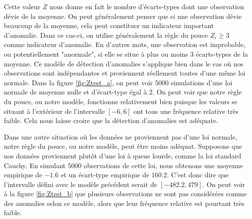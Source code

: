Cette valeur $Z$ nous donne en fait le nombre d'écarts-types dont une observation dévie de la moyenne. On peut généralement penser que si une observation dévie beaucoup de la moyenne, cela peut constituer un indicateur important d'anomalie. Dans ce cas-ci, on utilise généralement la règle du pouce $Z_i \ge 3$ comme indicateur d'anomalie. En d'autres mots, une observation est improbable, ou potentiellement "anormale", si elle se situe à plus ou moins 3 écarts-types de la moyenne. Ce modèle de détection d'anomalies s'applique bien dans le cas où nos observations sont indépendantes et proviennent réellement toutes d'une même loi normale. Dans la figure \ref{fig:Ztest_a}, on peut voir 5000 simulations d'une loi normale de moyenne nulle et d'écart-type égal à 2. On peut voir que notre règle du pouce, ou notre modèle, fonctionne relativement bien puisque les valeurs se situant à l'extérieur de l'intervalle $[-6, 6]$ ont tous une fréquence relative très faible. Cela nous laisse croire que la détection d'anomalies est adéquate. 

Dans une autre situation où les données ne proviennent pas d'une loi normale, notre règle du pouce, ou notre modèle, peut être moins adéquat. Supposons que nos données proviennent plutôt d'une loi à queue lourde, comme la loi standard Cauchy. En simulant $5000$ observations de cette loi, nous obtenons une moyenne empirique de $-1.6$ et un écart-type empirique de $160.2$. C'est donc dire que l'intervalle défini avec le modèle précédent serait de $[-482.2, 479]$. On peut voir à la figure \ref{fig:Ztest_b} que plusieurs observations ne sont pas considérées comme des anomalies selon ce modèle, alors que leur fréquence relative est pourtant très faible.

